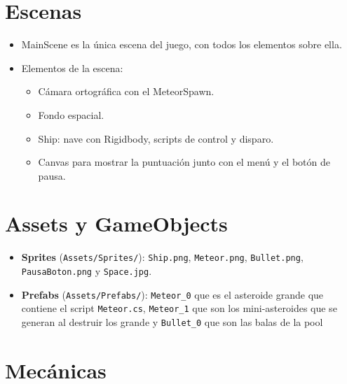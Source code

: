 \documentclass[12pt,twoside,letterpaper]{article}
\begin{document}



\newpage


\section{Escenas}

\begin{itemize}
    \item MainScene es la única escena del juego, con todos los elementos sobre ella.
    \item Elementos de la escena:
        \begin{itemize}
            \item Cámara ortográfica con el MeteorSpawn.
            \item Fondo espacial.
            \item Ship: nave con Rigidbody, scripts de control y disparo.
            \item Canvas para mostrar la puntuación junto con el menú y el botón de pausa.
        \end{itemize}
\end{itemize}

\section{Assets y GameObjects}

\begin{itemize}
    \item \textbf{Sprites} (\texttt{Assets/Sprites/}): \texttt{Ship.png}, \texttt{Meteor.png}, \texttt{Bullet.png}, \texttt{PausaBoton.png} y \texttt{Space.jpg}.
    \item \textbf{Prefabs} (\texttt{Assets/Prefabs/}): \texttt{Meteor\_0} que es el asteroide grande que contiene el script \texttt{Meteor.cs}, \texttt{Meteor\_1} que son los mini-asteroides que se generan al destruir los grande y \texttt{Bullet\_0} que son las balas de la pool
\end{itemize}

\section{Mecánicas}
\end{document}
